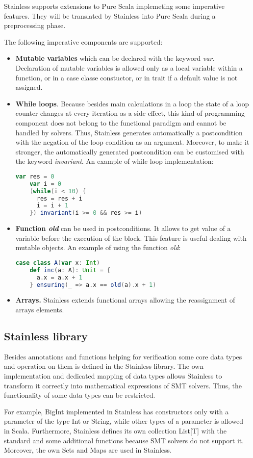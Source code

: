 Stainless supports extensions to Pure Scala implemeting some imperative features.
They will be translated by Stainless into Pure Scala during a preprocessing phase.

The following imperative components are supported:

\begin{itemize}
  \item \textbf{Mutable variables} which can be declared with the keyword \textit{var}.
  Declaration of mutable variables is allowed only as a local variable within a function, or in a case classe constuctor, or in trait if a default value is not assigned.
  \item  \textbf{While loops}. 
  Because besides main calculations in a loop the state of a loop counter changes at every iteration as a side effect, this kind of programming component does not belong to the functional paradigm and cannot be handled by solvers.
  Thus, Stainless generates automatically a postcondition with the negation of the loop condition as an argument. 
  Moreover, to make it stronger, the automatically generated postcondition can be customised with the keyword \textit{invariant}.
  An example of while loop implementation:
  \begin{lstlisting}[language=Scala]
    var res = 0
    var i = 0
    (while(i < 10) {
      res = res + i
      i = i + 1
    }) invariant(i >= 0 && res >= i)
  \end{lstlisting}
  \item \textbf{Function \textit{old}} can be used in postconditions. 
  It allows to get value of a variable before the execution of the block.
  This feature is useful dealing with mutable objects.
  An example of using the function \textit{old}:
  \begin{lstlisting}[language=Scala]
    case class A(var x: Int)
    def inc(a: A): Unit = {
      a.x = a.x + 1
    } ensuring(_ => a.x == old(a).x + 1)
  \end{lstlisting}
  \item \textbf{Arrays.} Stainless extends functional arrays allowing the reassignment of arrays elements. \cite{Stainless:imperative}
\end{itemize}


\subsection{Stainless library}

Besides annotations and functions helping for verification  some core data types and operation on them is defined in the Stainless library.
The own implementation and dedicated mapping of data types allows Stainless to transform it correctly into mathematical expressions of SMT solvers.
Thus, the functionality of some data types can be restricted.

For example, BigInt implemented in Stainless has constructors only with a parameter of the type Int or String, while other types of a parameter is allowed in Scala.
Furthermore, Stainless defines its own collection List[T] with the standard and some additional functions because SMT solvers do not support it.
Moreover, the own Sets and Maps are used in Stainless. \cite{Stainless:library}